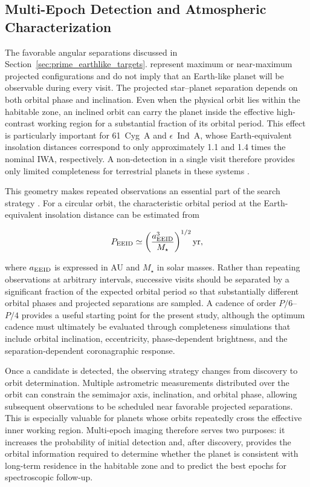 \subsection{Multi-Epoch Detection and Atmospheric Characterization}
\label{sec:earthlike_multi_epoch}

The favorable angular separations discussed in Section~\ref{sec:prime_earthlike_targets}. represent maximum or near-maximum projected configurations and do not imply that an
Earth-like planet will be observable during every visit. The projected
star--planet separation depends on both orbital phase and inclination. Even
when the physical orbit lies within the habitable zone, an inclined orbit
can carry the planet inside the effective high-contrast working region for a
substantial fraction of its orbital period. This effect is particularly
important for 61~Cyg~A and $\epsilon$~Ind~A, whose Earth-equivalent
insolation distances correspond to only approximately 1.1 and 1.4 times the
nominal IWA, respectively. A non-detection in a single visit therefore
provides only limited completeness for terrestrial planets in these systems
\cite{brown05}.

This geometry makes repeated observations an essential part of the search
strategy \cite{brown05,brown10}. For a circular orbit, the characteristic 
orbital period at the Earth-equivalent insolation distance can be estimated from

\begin{equation}
P_{\rm EEID}
\simeq
\left(
\frac{a_{\rm EEID}^{3}}{M_\star}
\right)^{1/2}
{\rm yr},
\label{eq:eeid_period}
\end{equation}

where $a_{\rm EEID}$ is expressed in AU and $M_\star$ in solar masses.
Rather than repeating observations at arbitrary intervals, successive visits
should be separated by a significant fraction of the expected orbital
period so that substantially different orbital phases and projected
separations are sampled. 
A cadence of order $P/6$--$P/4$ provides a useful starting point
for the present study, although the optimum cadence must ultimately
be evaluated through completeness simulations that include orbital
inclination, eccentricity, phase-dependent brightness, and the
separation-dependent coronagraphic response.

Once a candidate is detected, the observing strategy changes from discovery
to orbit determination. Multiple astrometric measurements distributed over the
orbit can constrain the semimajor axis, inclination, and orbital phase,
allowing subsequent observations to be scheduled near favorable projected
separations. This is especially valuable for planets whose orbits repeatedly
cross the effective inner working region. Multi-epoch imaging therefore
serves two purposes: it increases the probability of initial detection and,
after discovery, provides the orbital information required to determine
whether the planet is consistent with long-term residence in the habitable
zone and to predict the best epochs for spectroscopic follow-up.

